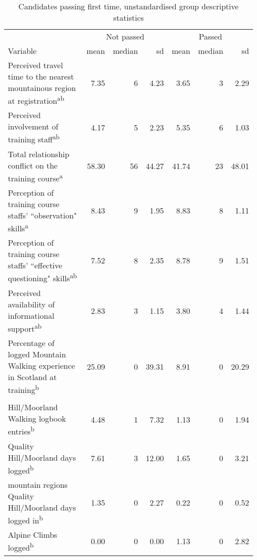 \documentclass[
  12pt,
  a4paper,
]{book}
\begin{document}
\begin{landscape}\begin{table}

\caption{\label{tab:ftp-combined-summary-stats}Candidates passing first time, unstandardised group descriptive statistics}
\centering
\begin{tabular}[t]{>{\raggedright\arraybackslash}p{14cm}rrrrrr}
\toprule
\multicolumn{1}{c}{ } & \multicolumn{3}{c}{Not passed} & \multicolumn{3}{c}{Passed} \\
\cmidrule(l{3pt}r{3pt}){2-4} \cmidrule(l{3pt}r{3pt}){5-7}
Variable & mean & median & sd & mean & median & sd\\
\midrule
\rowcolor{gray!6}  Perceived travel time to the nearest mountainous region at registration\textsuperscript{ab} & 7.35 & 6 & 4.23 & 3.65 & 3 & 2.29\\
Perceived involvement of training staff\textsuperscript{ab} & 4.17 & 5 & 2.23 & 5.35 & 6 & 1.03\\
\rowcolor{gray!6}  Total relationship conflict on the training course\textsuperscript{a} & 58.30 & 56 & 44.27 & 41.74 & 23 & 48.01\\
Perception of training course staffs' ``observation" skills\textsuperscript{a} & 8.43 & 9 & 1.95 & 8.83 & 8 & 1.11\\
\rowcolor{gray!6}  Perception of training course staffs' ``effective questioning" skills\textsuperscript{ab} & 7.52 & 8 & 2.35 & 8.78 & 9 & 1.51\\
Perceived availability of informational support\textsuperscript{ab} & 2.83 & 3 & 1.15 & 3.80 & 4 & 1.44\\
\rowcolor{gray!6}  Percentage of logged Mountain Walking experience in Scotland at training\textsuperscript{b} & 25.09 & 0 & 39.31 & 8.91 & 0 & 20.29\\
\addlinespace[0.3em]
\multicolumn{7}{l}{\textbf{At assessment, number of...}}\\
\hspace{1em}Hill/Moorland Walking logbook entries\textsuperscript{b} & 4.48 & 1 & 7.32 & 1.13 & 0 & 1.94\\
\rowcolor{gray!6}  \hspace{1em}Quality Hill/Moorland days logged\textsuperscript{b} & 7.61 & 3 & 12.00 & 1.65 & 0 & 3.21\\
\hspace{1em}mountain regions Quality Hill/Moorland days logged in\textsuperscript{b} & 1.35 & 0 & 2.27 & 0.22 & 0 & 0.52\\
\rowcolor{gray!6}  \hspace{1em}Alpine Climbs logged\textsuperscript{b} & 0.00 & 0 & 0.00 & 1.13 & 0 & 2.82\\

\end{tabular}
\end{table}
\end{landscape}
\end{document}
